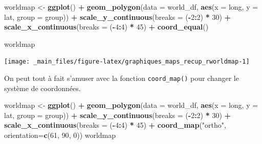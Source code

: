 \documentclass[
  11pt,
]{book}
\newenvironment{Shaded}{\begin{snugshade}}{\end{snugshade}}
\newcommand{\DataTypeTok}[1]{\textcolor[rgb]{0.13,0.29,0.53}{#1}}
\newcommand{\DecValTok}[1]{\textcolor[rgb]{0.00,0.00,0.81}{#1}}
\newcommand{\KeywordTok}[1]{\textcolor[rgb]{0.13,0.29,0.53}{\textbf{#1}}}
\newcommand{\NormalTok}[1]{#1}
\newcommand{\OperatorTok}[1]{\textcolor[rgb]{0.81,0.36,0.00}{\textbf{#1}}}
\newcommand{\StringTok}[1]{\textcolor[rgb]{0.31,0.60,0.02}{#1}}
\numberwithin{equation}{section}
\numberwithin{countremarque}{section}
\begin{document}
\begin{Shaded}
\begin{Highlighting}[]
\NormalTok{worldmap \textless{}{-}}\StringTok{ }\KeywordTok{ggplot}\NormalTok{() }\OperatorTok{+}
\StringTok{  }\KeywordTok{geom\_polygon}\NormalTok{(}\DataTypeTok{data =}\NormalTok{ world\_df, }
               \KeywordTok{aes}\NormalTok{(}\DataTypeTok{x =}\NormalTok{ long, }\DataTypeTok{y =}\NormalTok{ lat, }\DataTypeTok{group =}\NormalTok{ group)) }\OperatorTok{+}
\StringTok{  }\KeywordTok{scale\_y\_continuous}\NormalTok{(}\DataTypeTok{breaks =}\NormalTok{ (}\OperatorTok{{-}}\DecValTok{2}\OperatorTok{:}\DecValTok{2}\NormalTok{) }\OperatorTok{*}\StringTok{ }\DecValTok{30}\NormalTok{) }\OperatorTok{+}
\StringTok{  }\KeywordTok{scale\_x\_continuous}\NormalTok{(}\DataTypeTok{breaks =}\NormalTok{ (}\OperatorTok{{-}}\DecValTok{4}\OperatorTok{:}\DecValTok{4}\NormalTok{) }\OperatorTok{*}\StringTok{ }\DecValTok{45}\NormalTok{) }\OperatorTok{+}
\StringTok{  }\KeywordTok{coord\_equal}\NormalTok{()}

\NormalTok{worldmap}
\end{Highlighting}
\end{Shaded}

\begin{center}\texttt{[image: \_main\_files/figure-latex/graphiques\_maps\_recup\_rworldmap-1]} \end{center}

On peut tout à fait s'amuser avec la fonction \texttt{coord\_map()} pour changer le système de coordonnées.

\begin{Shaded}
\begin{Highlighting}[]
\NormalTok{worldmap \textless{}{-}}\StringTok{ }\KeywordTok{ggplot}\NormalTok{() }\OperatorTok{+}
\StringTok{  }\KeywordTok{geom\_polygon}\NormalTok{(}\DataTypeTok{data =}\NormalTok{ world\_df, }\KeywordTok{aes}\NormalTok{(}\DataTypeTok{x =}\NormalTok{ long, }\DataTypeTok{y =}\NormalTok{ lat, }\DataTypeTok{group =}\NormalTok{ group)) }\OperatorTok{+}
\StringTok{  }\KeywordTok{scale\_y\_continuous}\NormalTok{(}\DataTypeTok{breaks =}\NormalTok{ (}\OperatorTok{{-}}\DecValTok{2}\OperatorTok{:}\DecValTok{2}\NormalTok{) }\OperatorTok{*}\StringTok{ }\DecValTok{30}\NormalTok{) }\OperatorTok{+}
\StringTok{  }\KeywordTok{scale\_x\_continuous}\NormalTok{(}\DataTypeTok{breaks =}\NormalTok{ (}\OperatorTok{{-}}\DecValTok{4}\OperatorTok{:}\DecValTok{4}\NormalTok{) }\OperatorTok{*}\StringTok{ }\DecValTok{45}\NormalTok{) }\OperatorTok{+}
\StringTok{  }\KeywordTok{coord\_map}\NormalTok{(}\StringTok{"ortho"}\NormalTok{, }\DataTypeTok{orientation=}\KeywordTok{c}\NormalTok{(}\DecValTok{61}\NormalTok{, }\DecValTok{90}\NormalTok{, }\DecValTok{0}\NormalTok{))}
\NormalTok{worldmap}
\end{Highlighting}
\end{Shaded}
\end{document}
